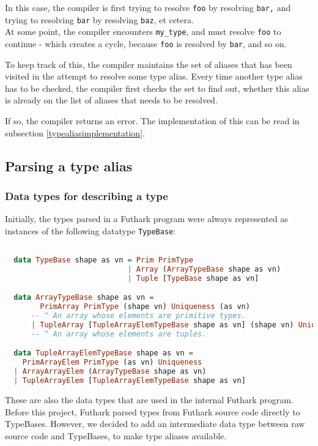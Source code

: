 \begin{enumerate}
    In this case, the compiler is first trying to resolve \texttt{foo} by
    resolving \texttt{bar,} and trying to resolving \texttt{bar} by resolving \texttt{baz}, et cetera. \\
    At some point, the compiler encounters \texttt{my\_type}, and must resolve \texttt{foo} to
    continue - which creates a cycle, because \texttt{foo} is resolved by \texttt{bar}, and so on.

    To keep track of this, the compiler maintains the set of aliases that has
    been visited in the attempt to resolve some type alias. Every time another
    type alias has to be checked, the compiler first checks the set to find out,
    whether this alias is already on the list of aliases that needs to be
    resolved.

    If so, the compiler returns an error.
    The implementation of this can be read in subsection \ref{typealiasimplementation}.
\end{enumerate}
\subsection{Parsing a type alias}
\subsubsection{Data types for describing a type}
Initially, the types parsed in a Futhark program were always represented as instances of the
following datatype \texttt{TypeBase}:
\begin{lstlisting}[language=Haskell]

  data TypeBase shape as vn = Prim PrimType
                            | Array (ArrayTypeBase shape as vn)
                            | Tuple [TypeBase shape as vn]

  data ArrayTypeBase shape as vn =
        PrimArray PrimType (shape vn) Uniqueness (as vn)
      -- ^ An array whose elements are primitive types.
      | TupleArray [TupleArrayElemTypeBase shape as vn] (shape vn) Uniqueness
      -- ^ An array whose elements are tuples.

  data TupleArrayElemTypeBase shape as vn =
    PrimArrayElem PrimType (as vn) Uniqueness
  | ArrayArrayElem (ArrayTypeBase shape as vn)
  | TupleArrayElem [TupleArrayElemTypeBase shape as vn]
\end{lstlisting}
\noindent
These are also the data types that are used in the internal Futhark program.
\\
Before this project, Futhark parsed types from Futhark source code directly to
TypeBases.
However, we decided to add an intermediate data type between raw source
code and TypeBases, to make type aliases available.

